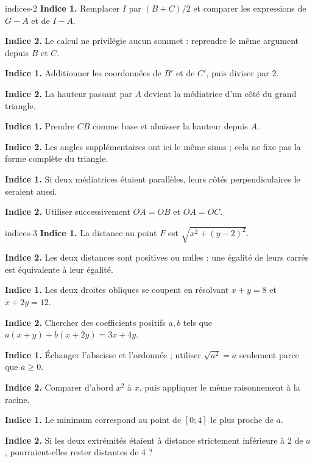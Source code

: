 \begin{blocEdition}{indices-2}
\textbf{Indice 1.} Remplacer $I$ par $(B+C)/2$ et comparer les expressions de $G-A$ et de $I-A$.\par\smallskip
\textbf{Indice 2.} Le calcul ne privilégie aucun sommet : reprendre le même argument depuis $B$ et $C$.\par
{}
\textbf{Indice 1.} Additionner les coordonnées de $B'$ et de $C'$, puis diviser par 2.\par\smallskip
\textbf{Indice 2.} La hauteur passant par $A$ devient la médiatrice d’un côté du grand triangle.\par
{}
\textbf{Indice 1.} Prendre $CB$ comme base et abaisser la hauteur depuis $A$.\par\smallskip
\textbf{Indice 2.} Les angles supplémentaires ont ici le même sinus ; cela ne fixe pas la forme complète du triangle.\par
{}
\textbf{Indice 1.} Si deux médiatrices étaient parallèles, leurs côtés perpendiculaires le seraient aussi.\par\smallskip
\textbf{Indice 2.} Utiliser successivement $OA=OB$ et $OA=OC$.\par

\end{blocEdition}
\begin{blocEdition}{indices-3}
\textbf{Indice 1.} La distance au point $F$ est $\sqrt{x^2+(y-2)^2}$.\par\smallskip
\textbf{Indice 2.} Les deux distances sont positives ou nulles : une égalité de leurs carrés est équivalente à leur égalité.\par
{}
\textbf{Indice 1.} Les deux droites obliques se coupent en résolvant $x+y=8$ et $x+2y=12$.\par\smallskip
\textbf{Indice 2.} Chercher des coefficients positifs $a,b$ tels que $a(x+y)+b(x+2y)=3x+4y$.\par
{}
\textbf{Indice 1.} Échanger l’abscisse et l’ordonnée ; utiliser $\sqrt{a^2}=a$ seulement parce que $a\ge0$.\par\smallskip
\textbf{Indice 2.} Comparer d’abord $x^2$ à $x$, puis appliquer le même raisonnement à la racine.\par
{}
\textbf{Indice 1.} Le minimum correspond au point de $[0;4]$ le plus proche de $a$.\par\smallskip
\textbf{Indice 2.} Si les deux extrémités étaient à distance strictement inférieure à 2 de $a$, pourraient-elles rester distantes de 4 ?\par

\end{blocEdition}
